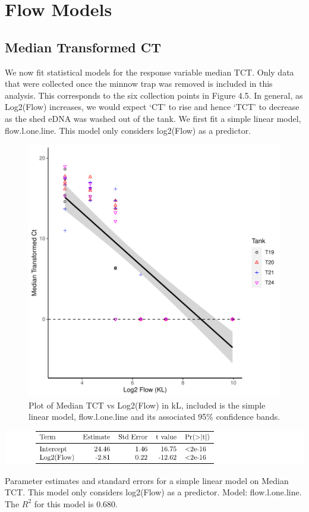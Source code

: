 \section{Flow Models}
\subsection{Median Transformed CT}


We now fit statistical models for the response variable median TCT. Only data that were collected once the minnow trap was removed is included in this analysis. This corresponds to the six collection points in Figure 4.5. In general, as Log2(Flow) increases, we would expect `CT' to rise and hence `TCT' to decrease as the shed eDNA was washed out of the tank. We first fit a simple linear model, flow.l.one.line. This model only considers log2(Flow) as a predictor.



\begin{figure}[H]
\includegraphics[scale=0.8]{Chapter4Images/flowmedtctgg.pdf}
\caption{Plot of Median TCT vs Log2(Flow) in kL, included is the simple linear model, flow.l.one.line and its associated 95\% confidence bands.}
\label{fig:flowmedtct}
\end{figure}


\begin{table}[H]
\includegraphics{Chapter4Images/flowloneline.pdf}
\caption{Parameter estimates and standard errors for a simple linear model on Median TCT. This model only considers log2(Flow) as a predictor. Model: flow.l.one.line. The $R^{2}$ for this model is 0.680.}
\label{fig:flow11}
\end{table}

